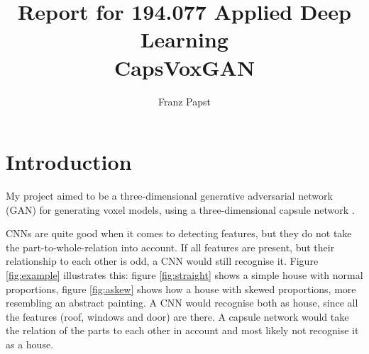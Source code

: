 \documentclass[11pt]{article}
\title{Report for 194.077 Applied Deep Learning\\\vspace{15pt}CapsVoxGAN}
\author{Franz Papst}
\begin{document}
\maketitle

\section{Introduction}

My project aimed to be a three-dimensional generative adversarial network (GAN) \cite{goodfellow2014} for generating voxel models, using a three-dimensional capsule network \cite{sabour2017}.

CNNs are quite good when it comes to detecting features, but they do not take the part-to-whole-relation into account. If all features are present, but their relationship to each other is odd, a CNN would still recognise it. Figure \ref{fig:example} illustrates this: figure \ref{fig:straight} shows a simple house with normal proportions, figure \ref{fig:askew} shows how a house with skewed proportions, more resembling an abstract painting. A CNN would recognise both as house, since all the features (roof, windows and door) are there. A capsule network would take the relation of the parts to each other in account and most likely not recognise it as a house.
\end{document}
